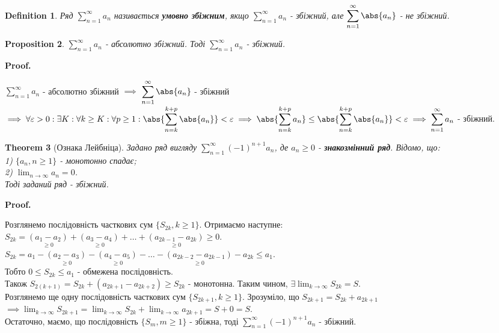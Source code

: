 \documentclass[a4paper, 10pt]{article}
\makeatletter
\def\huge{\displaystyle}
\def\qed{$\blacksquare$}
\theoremstyle{theoremdd}
\newtheorem{theorem}{Theorem}[subsection]
\theoremstyle{theoremdd}
\theoremstyle{theoremdd}
\newtheorem{definition}[theorem]{Definition}
\theoremstyle{theoremdd}
\theoremstyle{theoremdd}
\theoremstyle{theoremdd}
\newtheorem{proposition}[theorem]{Proposition}
\theoremstyle{theoremdd}
\theoremstyle{theoremdd}
\theoremstyle{theoremdd}
\renewenvironment{proof}[1][Proof.\\]{\par
\pushQED{\hfill \qed}%
\normalfont \topsep6\p@\@plus6\p@\relax
\trivlist
\item\relax
{\bfseries
#1\@addpunct{.}}\hspace\labelsep\ignorespaces
}{%
\popQED\endtrivlist\@endpefalse
}
\makeatother
\begin{document}
\begin{definition}
Ряд $\huge \sum_{n=1}^\infty a_n$ називається \textbf{умовно збіжним}, якщо $\huge \sum_{n=1}^\infty a_n$ - збіжний, але $\huge \sum_{n=1}^\infty \abs{a_n}$ - не збіжний.
\end{definition}

\begin{proposition}
$\huge \sum_{n=1}^\infty a_n$ - абсолютно збіжний. Тоді $\huge \sum_{n=1}^\infty a_n$ - збіжний.
\end{proposition}

\begin{proof}
$\huge \sum_{n=1}^\infty a_n$ - абсолютно збіжний $\implies$ $\huge \sum_{n=1}^\infty \abs{a_n}$ - збіжний $\implies \forall \varepsilon > 0: \exists K: \forall k \geq K: \forall p \geq 1: \\ \huge \abs{\sum_{n=k}^{k+p} \abs{a_n}} < \varepsilon \implies \abs{\sum_{n=k}^{k+p} a_n} \leq \abs{\sum_{n=k}^{k+p} \abs{a_n}} < \varepsilon \implies  \sum_{n=1}^\infty a_n$ - збіжний.
\end{proof}

\begin{theorem}[Ознака Лейбніца]
Задано ряд вигляду $\huge \sum_{n=1}^\infty (-1)^{n+1}a_n$, де $a_n \geq 0$ - \textbf{знакозмінний ряд}. Відомо, що:\\
1) $\{a_n, n \geq 1 \}$ - монотонно спадає;\\
2) $\huge \lim_{n \to \infty} a_n = 0$.\\
Тоді заданий ряд - збіжний.
\end{theorem}

\begin{proof}
Розглянемо послідовність часткових сум $\{S_{2k}, k \geq 1 \}$. Отримаємо наступне:\\
$S_{2k} = \underset{\geq 0}{(a_1 - a_2)} + \underset{\geq 0}{(a_3 - a_4)} + \dots + \underset{\geq 0}{(a_{2k-1} - a_{2k})} \geq 0$.\\
$S_{2k} = a_1 - \underset{\geq 0}{(a_2 - a_3)} - \underset{\geq 0}{(a_4 - a_5)} - \dots - \underset{\geq 0}{(a_{2k-2} - a_{2k-1})} - a_{2k} \leq a_1$.\\
Тобто $0 \leq S_{2k} \leq a_1$ - обмежена послідовність.\\
Також $S_{2(k+1)} = S_{2k} + (a_{2k+1}-a_{2k+2}) \geq S_{2k}$ - монотонна. Таким чином, $\exists \huge \lim_{k \to \infty} S_{2k} = S$.\\
Розглянемо ще одну послідовність часткових сум $\{S_{2k+1}, k \geq 1\}$. Зрозуміло, що $S_{2k+1} = S_{2k} + a_{2k+1}$\\
$\implies \huge \lim_{k \to \infty} S_{2k+1} = \lim_{k \to \infty} S_{2k} + \lim_{k \to \infty} a_{2k+1} = S + 0 = S$. \\
Остаточно, маємо, що послідовність $\{S_m, m \geq 1\}$ - збіжна, тоді $\huge \sum_{n=1}^\infty (-1)^{n+1}a_n$ - збіжний.
\end{proof}
\end{document}
